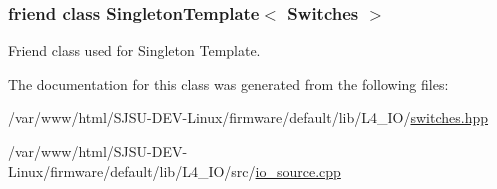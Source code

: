 \subsubsection[{\texorpdfstring{Singleton\+Template$<$ Switches $>$}{SingletonTemplate< Switches >}}]{\setlength{\rightskip}{0pt plus 5cm}friend class {\bf Singleton\+Template}$<$ {\bf Switches} $>$\hspace{0.3cm}{\ttfamily [friend]}}\hypertarget{classSwitches_a34518cba0f0db92a42ff640c8598694d}{}\label{classSwitches_a34518cba0f0db92a42ff640c8598694d}


Friend class used for Singleton Template. 



The documentation for this class was generated from the following files\+:\begin{DoxyCompactItemize}
\item 
/var/www/html/\+S\+J\+S\+U-\/\+D\+E\+V-\/\+Linux/firmware/default/lib/\+L4\+\_\+\+I\+O/\hyperlink{switches_8hpp}{switches.\+hpp}\item 
/var/www/html/\+S\+J\+S\+U-\/\+D\+E\+V-\/\+Linux/firmware/default/lib/\+L4\+\_\+\+I\+O/src/\hyperlink{io__source_8cpp}{io\+\_\+source.\+cpp}\end{DoxyCompactItemize}
